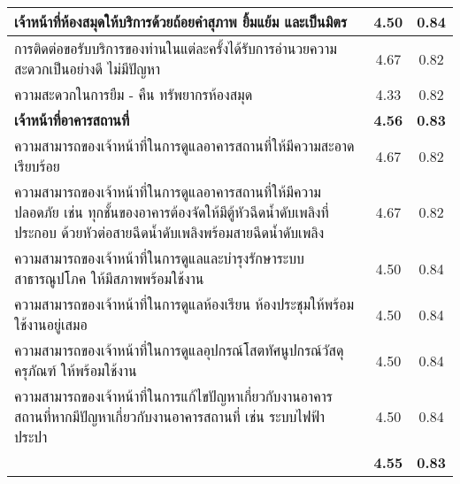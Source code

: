 \begin{longtable}{|>{\raggedright}p{9cm}|c|c|}
		เจ้าหน้าที่ห้องสมุดให้บริการด้วยถ้อยคำสุภาพ ยิ้มแย้ม และเป็นมิตร                                                                                                              & 4.50                            & 0.84          \\ \hline
		การติดต่อขอรับบริการของท่านในแต่ละครั้งได้รับการอำนวยความสะดวกเป็นอย่างดี ไม่มีปัญหา                                                                                          & 4.67                            & 0.82          \\ \hline
		ความสะดวกในการยืม - คืน ทรัพยากรห้องสมุด                                                                                                                                      & 4.33                            & 0.82          \\ \hline
		\textbf{เจ้าหน้าที่อาคารสถานที่}                                                                                          & \textbf{4.56} & \textbf{0.83}       \\ \hline
		ความสามารถของเจ้าหน้าที่ในการดูแลอาคารสถานที่ให้มีความสะอาดเรียบร้อย                                                                                                          & 4.67                            & 0.82          \\ \hline
		ความสามารถของเจ้าหน้าที่ในการดูแลอาคารสถานที่ให้มีความปลอดภัย เช่น ทุกชั้นของอาคารต้องจัดให้มีตู้หัวฉีดน้ำดับเพลิงที่ประกอบ ด้วยหัวต่อสายฉีดน้ำดับเพลิงพร้อมสายฉีดน้ำดับเพลิง & 4.67                            & 0.82          \\ \hline
		ความสามารถของเจ้าหน้าที่ในการดูแลและบำรุงรักษาระบบสาธารณูปโภค ให้มีสภาพพร้อมใช้งาน                                                                                            & 4.50                            & 0.84          \\ \hline
		ความสามารถของเจ้าหน้าที่ในการดูแลห้องเรียน ห้องประชุมให้พร้อมใช้งานอยู่เสมอ                                                                                                   & 4.50                            & 0.84          \\ \hline
		ความสามารถของเจ้าหน้าที่ในการดูแลอุปกรณ์โสตทัศนูปกรณ์วัสดุ ครุภัณฑ์ ให้พร้อมใช้งาน                                                                                            & 4.50                            & 0.84          \\ \hline
		ความสามารถของเจ้าหน้าที่ในการแก้ไขปัญหาเกี่ยวกับงานอาคารสถานที่หากมีปัญหาเกี่ยวกับงานอาคารสถานที่ เช่น ระบบไฟฟ้า ประปา                                                        & 4.50                            & 0.84          \\ \hline
		\multicolumn{1}{|r|}{\textbf{ค่าเฉลี่ยรวม}}       & \textbf{4.55}                            & \textbf{0.83}          \\ \hline

\end{longtable}

